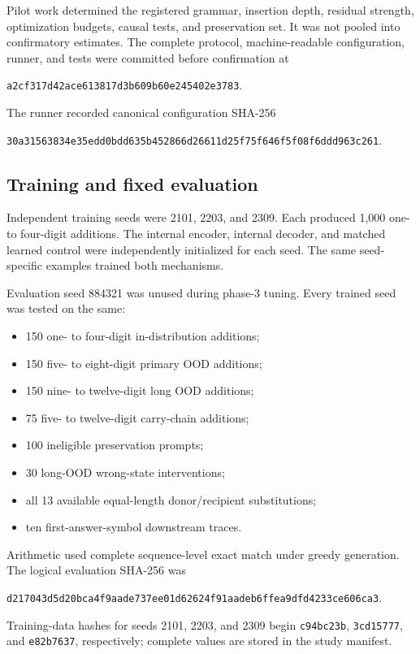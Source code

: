 \documentclass[11pt]{article}
\newcommand{\code}[1]{\texttt{#1}}
\begin{document}
Pilot work determined the registered grammar, insertion depth, residual
strength, optimization budgets, causal tests, and preservation set. It was not
pooled into confirmatory estimates. The complete protocol, machine-readable
configuration, runner, and tests were committed before confirmation at
\begin{sloppypar}
\code{a2cf317d42ace613817d3b609b60e245402e3783}.
\end{sloppypar}
The runner recorded canonical configuration SHA-256
\begin{sloppypar}
\code{30a31563834e35edd0bdd635b452866d26611d25f75f646f5f08f6ddd963c261}.
\end{sloppypar}

\subsection{Training and fixed evaluation}

Independent training seeds were 2101, 2203, and 2309. Each produced 1,000
one- to four-digit additions. The internal encoder, internal decoder, and
matched learned control were independently initialized for each seed. The
same seed-specific examples trained both mechanisms.

Evaluation seed 884321 was unused during phase-3 tuning. Every trained seed
was tested on the same:

\begin{itemize}
  \item 150 one- to four-digit in-distribution additions;
  \item 150 five- to eight-digit primary OOD additions;
  \item 150 nine- to twelve-digit long OOD additions;
  \item 75 five- to twelve-digit carry-chain additions;
  \item 100 ineligible preservation prompts;
  \item 30 long-OOD wrong-state interventions;
  \item all 13 available equal-length donor/recipient substitutions;
  \item ten first-answer-symbol downstream traces.
\end{itemize}

Arithmetic used complete sequence-level exact match under greedy generation.
The logical evaluation SHA-256 was
\begin{sloppypar}
\code{d217043d5d20bca4f9aade737ee01d62624f91aadeb6ffea9dfd4233ce606ca3}.
\end{sloppypar}
Training-data hashes for seeds 2101, 2203, and 2309 begin
\code{c94bc23b}, \code{3cd15777}, and \code{e82b7637}, respectively; complete
values are stored in the study manifest.
\end{document}

